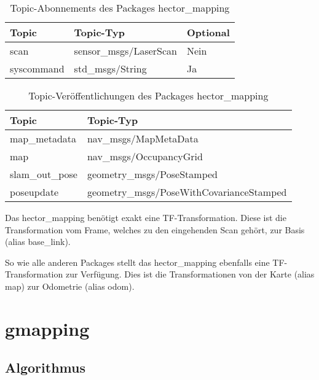 \begin{table}[t]
  \caption{Topic-Abonnements des Packages hector\_mapping}
  \label{hector-mapping-Topic-Abonnements}
  \centering
  \sffamily
  \begin{footnotesize}
    \begin{tabular}{l l l}
    \toprule
    \textbf{Topic} & \textbf{Topic-Typ} & \textbf{Optional}\\
    \midrule
    scan	& sensor\_msgs/LaserScan & Nein\\
    syscommand & std\_msgs/String & Ja\\
    \bottomrule
    \end{tabular}
  \end{footnotesize}
  \rmfamily
\end{table}

\begin{table}[t]
  \caption{Topic-Veröffentlichungen des Packages hector\_mapping}
  \label{hector-mapping-Topic-Veröffentlichungen}
  \centering
  \sffamily
  \begin{footnotesize}
    \begin{tabular}{l l}
    \toprule
    \textbf{Topic} & \textbf{Topic-Typ}\\
    \midrule
    map\_metadata & nav\_msgs/MapMetaData\\
    map & nav\_msgs/OccupancyGrid\\
    slam\_out\_pose & geometry\_msgs/PoseStamped\\
    poseupdate & geometry\_msgs/PoseWithCovarianceStamped\\
    \bottomrule
    \end{tabular}
  \end{footnotesize}
  \rmfamily
\end{table}

Das hector\_mapping benötigt exakt eine TF-Transformation. Diese ist die Transformation vom Frame, welches zu den eingehenden Scan gehört, zur Basis (alias base\_link).

So wie alle anderen Packages stellt das hector\_mapping ebenfalls eine TF-Transformation zur Verfügung. Dies ist die Transformationen von der Karte (alias map) zur Odometrie (alias odom). \autocite{hectorMappingRosWiki}

\section{gmapping}

\subsection{Algorithmus}

